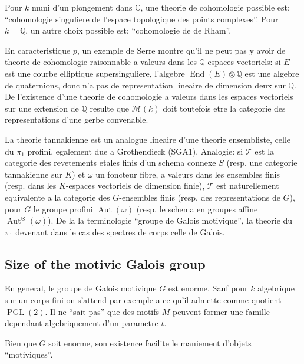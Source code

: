 \documentclass[11pt,a4paper]{article}
\theoremstyle{plain}
\theoremstyle{definition}
\DeclareMathOperator{\Aut}{Aut}
\DeclareMathOperator{\End}{End}
\DeclareMathOperator{\PGL}{PGL}
\newcommand{\Q}{\mathbb{Q}}
\newcommand{\C}{\mathbb{C}}
\begin{document}
Pour $k$ muni d'un plongement dans $\C$, une theorie de cohomologie possible est: ``cohomologie singuliere de l'espace topologique des points complexes''. Pour $k = \Q$, un autre choix possible est: ``cohomologie de de Rham''.

En caracteristique $p$, un exemple de Serre montre qu'il ne peut pas y avoir de theorie de cohomologie raisonnable a valeurs dans les $\Q$-espaces vectoriels: si $E$ est une courbe elliptique supersinguliere, l'algebre $\End(E) \otimes \Q$ est une algebre de quaternions, donc n'a pas de representation lineaire de dimension deux sur $\Q$. De l'existence d'une theorie de cohomologie a valeurs dans les espaces vectoriels sur une extension de $\Q$ resulte que $\mathcal{M}(k)$ doit toutefois etre la categorie des representations d'une gerbe convenable.

La theorie tannakienne est un analogue lineaire d'une theorie ensembliste, celle du $\pi_1$ profini, egalement due a Grothendieck (SGA1). Analogie: si $\mathcal{T}$ est la categorie des revetements etales finis d'un schema connexe $S$ (resp. une categorie tannakienne sur $K$) et $\omega$ un foncteur fibre, a valeurs dans les ensembles finis (resp. dans les $K$-espaces vectoriels de dimension finie), $\mathcal{T}$ est naturellement equivalente a la categorie des $G$-ensembles finis (resp. des representations de $G$), pour $G$ le groupe profini $\Aut(\omega)$ (resp. le schema en groupes affine $\underline{\Aut}^{\otimes}(\omega)$). De la la terminologie ``groupe de Galois motivique'', la theorie du $\pi_1$ devenant dans le cas des spectres de corps celle de Galois.

\subsection{Size of the motivic Galois group}

En general, le groupe de Galois motivique $G$ est enorme. Sauf pour $k$ algebrique sur un corps fini on s'attend par exemple a ce qu'il admette comme quotient $\PGL(2)$. Il ne ``sait pas'' que des motifs $M$ peuvent former une famille dependant algebriquement d'un parametre $t$.

Bien que $G$ soit enorme, son existence facilite le maniement d'objets ``motiviques''.
\end{document}
